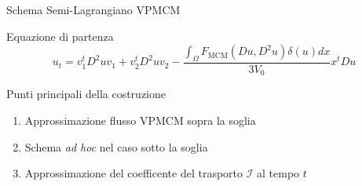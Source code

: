 \begin{frame}{Schema Semi-Lagrangiano VPMCM}
  \begin{block}{Equazione di partenza}
    \[
    u_t=v_1^tD^2uv_1+v_2^tD^2uv_2 - \frac{\int_{\Omega}F_{\text{MCM}}(Du,D^2u)\delta(u)dx}{3V_0}x^tDu
    \]
  \end{block}
  \begin{block}{Punti principali della costruzione}
    \begin{enumerate}
    \item Approssimazione flusso VPMCM sopra la soglia
    \item Schema \emph{ad hoc} nel caso sotto la soglia
    \item Approssimazione del coefficente del trasporto $\mathcal{I}$
      al tempo $t$ 
    \end{enumerate}
  \end{block}
\end{frame}
 
